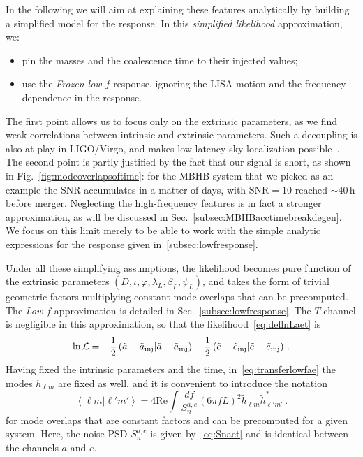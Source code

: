 \documentclass[aps,showpacs,twocolumn,prd,superscriptaddress,nofootinbib]{revtex4-1}
\newcommand{\be}{\begin{equation}}
\newcommand{\ee}{\end{equation}}
\newcommand\calL{{\mathcal{L}}}
\newcommand\betaL{{\beta_{L}}}
\newcommand\lambdaL{{\lambda_{L}}}
\newcommand\psiL{{\psi_{L}}}
\begin{document}
In the following we will aim at explaining these features analytically by building a simplified model for the response. In this \textit{simplified likelihood} approximation, we: 
\begin{itemize}
	\item pin the masses and the coalescence time to their injected values;
	\item use the \textit{Frozen low-$f$} response, ignoring the LISA motion and the frequency-dependence in the response.
\end{itemize}
The first point allows us to focus only on the extrinsic parameters, as we find weak correlations between intrinsic and extrinsic parameters. Such a decoupling is also at play in LIGO/Virgo, and makes low-latency sky localization possible~\cite{SingerPrice15}. The second point is partly justified by the fact that our signal is short, as shown in Fig.~\ref{fig:modeoverlapsoftime}: for the MBHB system that we picked as an example the SNR accumulates in a matter of days, with $\mathrm{SNR}=10$ reached $\sim 40 \,\mathrm{h}$ before merger. Neglecting the high-frequency features is in fact a stronger approximation, as will be discussed in Sec.~\ref{subsec:MBHBacctimebreakdegen}. We focus on this limit merely to be able to work with the simple analytic expressions for the response given in~\ref{subsec:lowfresponse}.

Under all these simplifying assumptions, the likelihood becomes pure function of the extrinsic parameters $(D, \iota, \varphi, \lambdaL, \betaL, \psiL)$, and takes the form of trivial geometric factors multiplying constant mode overlaps that can be precomputed. The \textit{Low-$f$} approximation is detailed in Sec.~\ref{subsec:lowfresponse}. The $T$-channel is negligible in this approximation, so that the likelihood~\eqref{eq:deflnLaet} is
\be
	\ln \calL = -\frac{1}{2} \left( \tilde{a} - \tilde{a}_{\rm inj} | \tilde{a} - \tilde{a}_{\rm inj} \right) -\frac{1}{2} \left( \tilde{e} - \tilde{e}_{\rm inj} | \tilde{e} - \tilde{e}_{\rm inj} \right) \,.
\ee
Having fixed the intrinsic parameters and the time, in~\eqref{eq:transferlowfae} the modes $h_{\ell m}$ are fixed as well, and it is convenient to introduce the notation
\be\label{eq:innerproductlmlpmp}
	\left\langle \ell m | \ell' m' \right\rangle = 4\mathrm{Re} \int \frac{df}{S_{n}^{a,e}} \left( 6 \pi f L\right)^{2} \tilde{h}_{\ell m} \tilde{h}_{\ell' m'}^{*} \,.
\ee
for mode overlaps that are constant factors and can be precomputed for a given system. Here, the noise PSD $S_{n}^{a,e}$ is given by~\eqref{eq:Snaet} and is identical between the channels $a$ and $e$.
\end{document}
